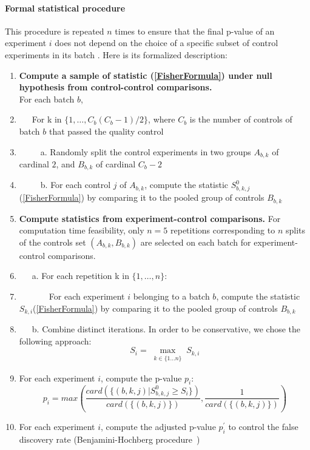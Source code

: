 \paragraph*{Formal statistical procedure\\}
This procedure is repeated $n$ times to ensure that the final p-value of an experiment $i$ does not depend on the choice of a specific subset of control experiments in its batch%
. Here is its formalized description:
\begin{enumerate}
\item {\bf Compute a sample of statistic (\ref{FisherFormula})  under null hypothesis from control-control comparisons.}\\ For each batch $b$,
\item[] \ \ \
 For k in $\{1,\ldots,C_b(C_b-1)/2\}$, where $C_b$ is the number of controls of batch $b$ that passed the quality control
\item[] \ \ \ \ \ a. Randomly split the control experiments in two
  groups $A_{b,k}$ of cardinal $2$, and $B_{b,k}$ of cardinal $C_b-2$
\item[] \ \ \ \ \ b. For each control $j$ of $A_{b,k}$, compute the statistic $S^{0}_{b,k,j}$ (\ref{FisherFormula}) by comparing it to the pooled group of controls $B_{b,k}$

\item {\bf Compute statistics from experiment-control comparisons.} For computation time feasibility, only $n=5$ repetitions corresponding to $n$ splits of the controls set $(A_{b,k}, B_{b,k})$ are selected on each batch for experiment-control comparisons. 
\item[] \ \ \ a. For each repetition k in $\{1,\ldots,n\}$:
\item[]\ \ \ \ \ \ \ For each experiment $i$  belonging to a batch $b$, compute the statistic $S_{k,i}$(\ref{FisherFormula}) by comparing it to the pooled group of controls $B_{b,k}$
\item[] \ \ \  b. Combine distinct iterations. In order to be conservative, we chose the following approach:
\begin{equation}
S_{i} = {\max}_{\substack{k \in \{1\ldots n \}}} S_{k,i}
\end{equation}

\item  For each experiment $i$, compute the p-value $p_{i}$:
\[p_{i} =max \left( \dfrac{card( \{(b,k,j) | S^{0}_{b,k,j}\geq S_{i} \})}
{card( \{ (b,k,j) \})},
 \dfrac{1}
 {card( \{ (b,k,j) \})}\right) \]
\item For each experiment $i$, compute the adjusted p-value $p^\prime_{i}$ to control the false discovery rate (Benjamini-Hochberg procedure~\cite{Benjamini1})
\end{enumerate}
